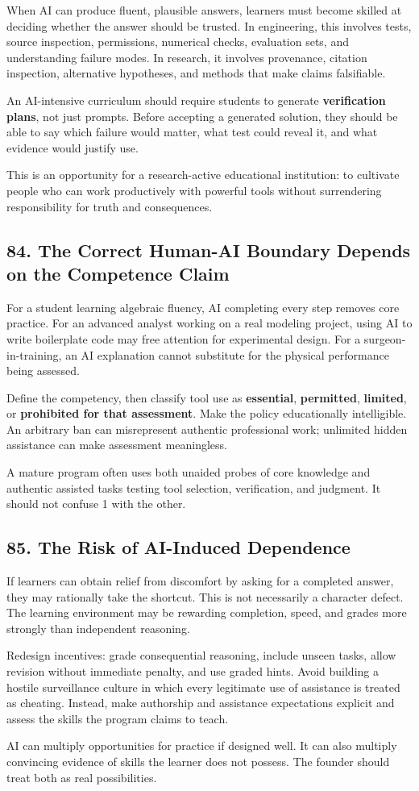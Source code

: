 When AI can produce fluent, plausible answers, learners must become skilled at deciding whether the answer should be trusted. In engineering, this involves tests, source inspection, permissions, numerical checks, evaluation sets, and understanding failure modes. In research, it involves provenance, citation inspection, alternative hypotheses, and methods that make claims falsifiable.

An AI-intensive curriculum should require students to generate \textbf{verification plans}, not just prompts. Before accepting a generated solution, they should be able to say which failure would matter, what test could reveal it, and what evidence would justify use.

This is an opportunity for a research-active educational institution: to cultivate people who can work productively with powerful tools without surrendering responsibility for truth and consequences.

\subsection*{84. The Correct Human-AI Boundary Depends on the Competence Claim}

For a student learning algebraic fluency, AI completing every step removes core practice. For an advanced analyst working on a real modeling project, using AI to write boilerplate code may free attention for experimental design. For a surgeon-in-training, an AI explanation cannot substitute for the physical performance being assessed.

Define the competency, then classify tool use as \textbf{essential}, \textbf{permitted}, \textbf{limited}, or \textbf{prohibited for that assessment}. Make the policy educationally intelligible. An arbitrary ban can misrepresent authentic professional work; unlimited hidden assistance can make assessment meaningless.

A mature program often uses both unaided probes of core knowledge and authentic assisted tasks testing tool selection, verification, and judgment. It should not confuse 1 with the other.

\subsection*{85. The Risk of AI-Induced Dependence}

If learners can obtain relief from discomfort by asking for a completed answer, they may rationally take the shortcut. This is not necessarily a character defect. The learning environment may be rewarding completion, speed, and grades more strongly than independent reasoning.

Redesign incentives: grade consequential reasoning, include unseen tasks, allow revision without immediate penalty, and use graded hints. Avoid building a hostile surveillance culture in which every legitimate use of assistance is treated as cheating. Instead, make authorship and assistance expectations explicit and assess the skills the program claims to teach.

AI can multiply opportunities for practice if designed well. It can also multiply convincing evidence of skills the learner does not possess. The founder should treat both as real possibilities.
